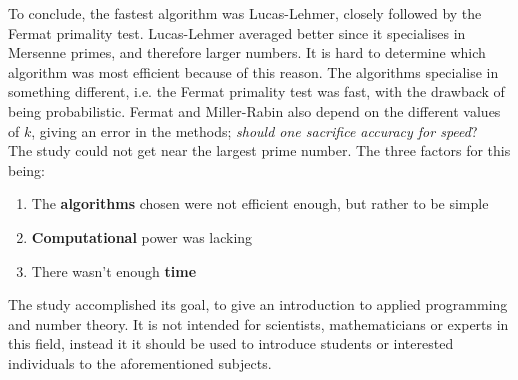 \documentclass[main.tex]{subfiles}
\begin{document}
To conclude, the fastest algorithm was Lucas-Lehmer, closely followed by the
Fermat primality test. Lucas-Lehmer averaged better since it specialises in
Mersenne primes, and therefore larger numbers. It is hard to determine which
algorithm was most efficient because of this reason. The algorithms specialise
in something different, i.e. the Fermat primality test was fast, with the
drawback of being probabilistic. Fermat and Miller-Rabin also depend on the
different values of $k$, giving an error in the methods; \emph{should one
  sacrifice accuracy for speed}? \\

The study could not get near the largest prime number. The three factors for
this being:

\begin{enumerate}
\item The \textbf{algorithms} chosen were not efficient enough, but rather to be
  simple
\item \textbf{Computational} power was lacking
\item There wasn't enough \textbf{time}
\end{enumerate}

The study accomplished its goal, to give an introduction to applied programming
and number theory. It is not intended for scientists, mathematicians or experts
in this field, instead it it should be used to introduce students or interested
individuals to the aforementioned subjects.
\end{document}
